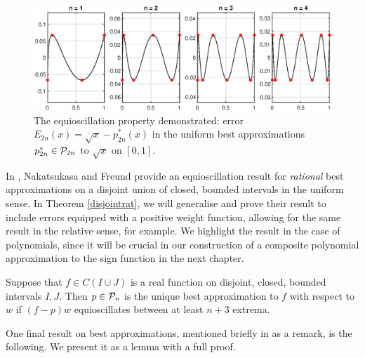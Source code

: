 \begin{figure}[t!]
    \centering
    \includegraphics[width=\textwidth,height=\textheight,keepaspectratio]{figures/chapter_2/sqrtnew.eps}
    \caption{The equioscillation property demonstrated: error $E_{2n}(x)=\sqrt{x}-p^*_{2n}(x)$ in the uniform best approximations $p^*_{2n}\in\mathcal{P}_{2n}$ to $\sqrt x$ on $[0,1]$.}
    \label{fig:sqrt}
\end{figure}

In \cite[Lemma 2]{YujiZolotFreund}, Nakatsukasa and Freund provide an equioscillation result for \textit{rational} best approximations on a disjoint union of closed, bounded intervals in the uniform sense. In Theorem \ref{disjointrat}, we will generalise and prove their result to include errors equipped with a positive weight function, allowing for the same result in the relative sense, for example. We highlight the result in the case of polynomials, since it will be crucial in our construction of a composite polynomial approximation to the sign function in the next chapter.

\begin{corollary}\label{disjoint}
Suppose that $f\in C(I\cup J)$ is a real function on disjoint, closed, bounded intervals $I,J$. Then $p \in \mathcal{P}_n$ is the unique best approximation to $f$ with respect to $w$ if $(f-p)w$ equioscillates between at least $n+3$ extrema.
\end{corollary}


One final result on best approximations, mentioned briefly in \cite[p. 2]{Erem} as a remark, is the following. We present it as a lemma with a full proof.

